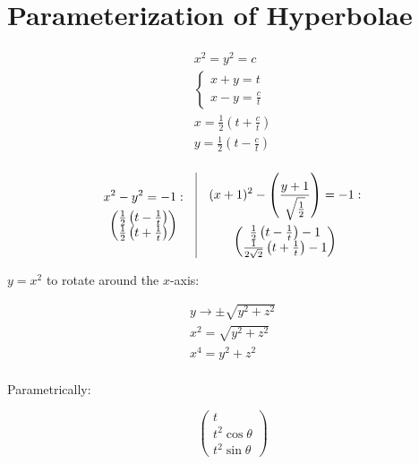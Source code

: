 \documentclass[00_complete]{subfiles}
\begin{document}
\section{Parameterization of Hyperbolae}
$$
\begin{gathered}
    x^2=y^2= c \\
    \begin{cases}
        x+y = t \\
        x-y = \frac{c}{t}
    \end{cases} \\
    x=\frac{1}{2}\left(t+\frac{c}{t}\right) \\
    y=\frac{1}{2}\left(t-\frac{c}{t}\right) \\
\end{gathered}
$$

$$\begin{gathered}
    x^2-y^2=-1: \\
    \begin{pmatrix}
        \frac{1}{2}\left(t-\frac{1}{t}\right) \\
        \frac{1}{2}\left(t+\frac{1}{t}\right) \\
    \end{pmatrix}
\end{gathered} \quad \vline \quad
\begin{gathered}
    (x+1)^2-\left(\frac{y+1}{\sqrt{\frac{1}{2}}}\right)=-1: \\
    \begin{pmatrix}
        \frac{1}{2}\left(t-\frac{1}{t}\right)-1 \\
        \frac{1}{2\sqrt 2}\left(t+\frac{1}{t}\right)-1 \\
    \end{pmatrix}
\end{gathered}$$

$y=x^2$ to rotate around the $x$-axis:

$$
\begin{gathered}
    y \to \pm \sqrt{y^2+z^2} \\
    x^2 = \sqrt{y^2+z^2} \\
    x^4 = y^2+z^2 \\
\end{gathered}
$$

Parametrically:

$$\begin{pmatrix}
    t \\ t^2 \cos \theta \\ t^2 \sin \theta
\end{pmatrix}$$
\end{document}
